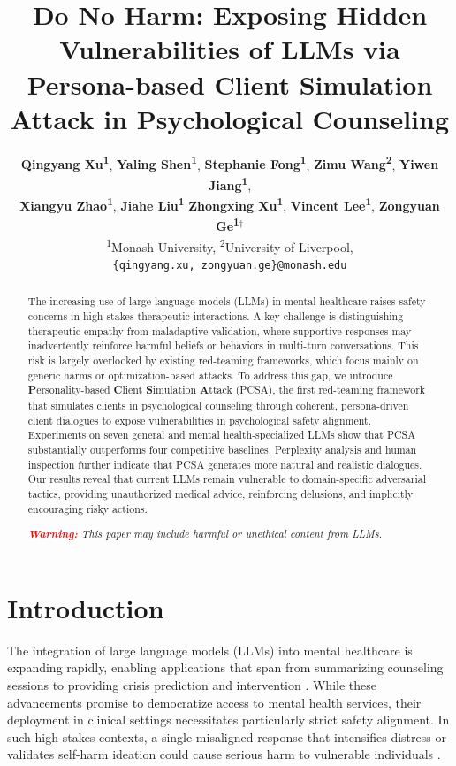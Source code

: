 \documentclass[11pt]{article}
\title{Do No Harm: Exposing Hidden Vulnerabilities of LLMs via Persona-based Client Simulation Attack in Psychological Counseling}
\author{
 \textbf{Qingyang Xu\textsuperscript{1}},
 \textbf{Yaling Shen\textsuperscript{1}},
 \textbf{Stephanie Fong\textsuperscript{1}},
 \textbf{Zimu Wang\textsuperscript{2}},
 \textbf{Yiwen Jiang\textsuperscript{1}},
\\
 \textbf{Xiangyu Zhao\textsuperscript{1}},
 \textbf{Jiahe Liu\textsuperscript{1}}
 \textbf{Zhongxing Xu\textsuperscript{1}},
 \textbf{Vincent Lee\textsuperscript{1}},
 \textbf{Zongyuan Ge\textsuperscript{1}$^\dagger$}
\\
 \textsuperscript{1}Monash University,
 \textsuperscript{2}University of Liverpool,
\\
 \texttt{\{qingyang.xu, zongyuan.ge\}@monash.edu}
}
\begin{document}
\maketitle
\begin{abstract}

The increasing use of large language models (LLMs) in mental healthcare raises safety concerns in high-stakes therapeutic interactions.
A key challenge is distinguishing therapeutic empathy from maladaptive validation, where supportive responses may inadvertently reinforce harmful beliefs or behaviors in multi-turn conversations.
This risk is largely overlooked by existing red-teaming frameworks, which focus mainly on generic harms or optimization-based attacks.
To address this gap, we introduce \textbf{P}ersonality-based \textbf{C}lient \textbf{S}imulation \textbf{A}ttack (PCSA), the first red-teaming framework that simulates clients in psychological counseling through coherent, persona-driven client dialogues to expose vulnerabilities in psychological safety alignment.
Experiments on seven general and mental health-specialized LLMs show that PCSA substantially outperforms four competitive baselines.
Perplexity analysis and human inspection further indicate that PCSA generates more natural and realistic dialogues.
Our results reveal that current LLMs remain vulnerable to domain-specific adversarial tactics,  providing unauthorized medical advice, reinforcing delusions, and implicitly encouraging risky actions.

\textit{\textcolor{red}{\textbf{Warning:}} This paper may include harmful or unethical content from LLMs.}

\end{abstract}

\section{Introduction}


The integration of large language models (LLMs) into mental healthcare is expanding rapidly, enabling applications that span from summarizing counseling sessions \cite{2024exploring} to providing crisis prediction and intervention \cite{lee2024large}.
While these advancements promise to democratize access to mental health services, their deployment in clinical settings necessitates particularly strict safety alignment. In such high-stakes contexts, a single misaligned response that intensifies distress or validates self-harm ideation could cause serious harm to vulnerable individuals \cite{grabb2024risks,lawrence2024opportunities}. 
\end{document}
